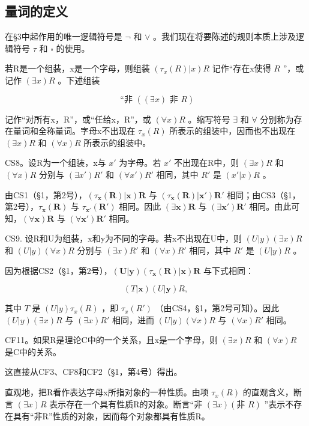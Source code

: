 \subsection{量词的定义}

在§3中起作用的唯一逻辑符号是 \(\neg\) 和 \(\vee\) 。我们现在将要陈述的规则本质上涉及逻辑符号 \(\tau\) 和 \(\square\) 的使用。

若R是一个组装，x是一个字母，则组装 \((\tau_{x}(R)|x)R\) 记作“存在x使得 \(R\) ”，或记作 \((\exists x)R\) 。下述组装

\[
\text {   ``非   } ((\exists x) \text {   非   } R)
\]

记作“对所有x，R”，或“任给x，R”，或 \((\forall x)R\) 。缩写符号 \(\exists\) 和 \(\forall\) 分别称为存在量词和全称量词。字母x不出现在 \(\tau_{x}(R)\) 所表示的组装中，因而也不出现在 \((\exists x)R\) 和 \((\forall x)R\) 所表示的组装中。

CS8。设R为一个组装，x与 \(x'\) 为字母。若 \(x'\) 不出现在R中，则 \((\exists x)R\) 和 \((\forall x)R\) 分别与 \((\exists x')R'\) 和 \((\forall x')R'\) 相同，其中 \(R'\) 是 \((x'|x)R\) 。

由CS1（§1，第2号），\((\tau_{\mathbf{x}}(\mathbf{R})|\mathbf{x})\mathbf{R}\) 与 \((\tau_{\mathbf{x}}(\mathbf{R})|\mathbf{x}')\mathbf{R}'\) 相同；由CS3（§1，第2号），\(\tau_{\mathbf{x}}(\mathbf{R})\) 与 \(\tau_{\mathbf{x}'}(\mathbf{R}')\) 相同。因此 \((\exists \mathbf{x})\mathbf{R}\) 与 \((\exists \mathbf{x}')\mathbf{R}'\) 相同。由此可知，\((\forall \mathbf{x})\mathbf{R}\) 与 \((\forall \mathbf{x}')\mathbf{R}'\) 相同。

CS9. 设R和U为组装，x和y为不同的字母。若x不出现在U中，则 \((U|y)(\exists x)R\) 和 \((U|y)(\forall x)R\) 分别与 \((\exists x)R'\) 和 \((\forall x)R'\) 相同，其中 \(R'\) 是 \((U|y)R\) 。

因为根据CS2（§1，第2号），\((\pmb{U}|\pmb{y})(\tau_{\pmb{x}}(\pmb{R})|\pmb{x})\pmb{R}\) 与下式相同：

\[
(T | \boldsymbol {x}) (U | \boldsymbol {y}) R,
\]

其中 \(T\) 是 \((U|y)\tau_x(R)\) ，即 \(\tau_x(R')\) （由CS4，§1，第2号可知）。因此 \((U|y)(\exists x)R\) 与 \((\exists x)R'\) 相同，进而 \((U|y)(\forall x)R\) 与 \((\forall x)R'\) 相同。

CF11。如果R是理论C中的一个关系，且x是一个字母，则 \((\exists x)R\) 和 \((\forall x)R\) 是C中的关系。

这直接从CF3、CF8和CF2（§1，第4号）得出。

直观地，把R看作表达字母x所指对象的一种性质。由项 \(\tau_{x}(R)\) 的直观含义，断言 \((\exists x)R\) 表示存在一个具有性质R的对象。断言“非 \((\exists x)(\text{非 } R)\) ”表示不存在具有“非R”性质的对象，因而每个对象都具有性质R。


